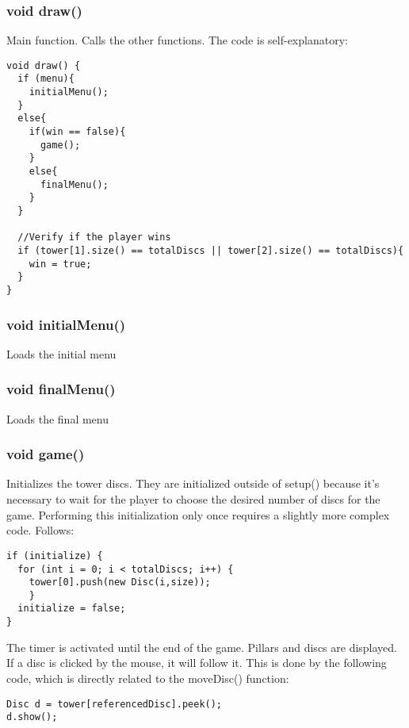 \documentclass[
	12pt,				%
	oneside,			%
	a4paper,			%
	english,			%
	brazil,				%
	]{abntex2}
\begin{document}
{\subsubsection{void draw()}
Main function. Calls the other functions. The code is self-explanatory:

\begin{itshape}
\begin{verbatim}
void draw() {
  if (menu){
    initialMenu(); 
  }
  else{
    if(win == false){  
      game();
    }
    else{
      finalMenu();
    }
  }

  //Verify if the player wins
  if (tower[1].size() == totalDiscs || tower[2].size() == totalDiscs){
    win = true;  
  }
}

\end{verbatim}
\end{itshape}
\subsubsection{void initialMenu()}
Loads the initial menu
\subsubsection{void finalMenu()}
Loads the final menu
\subsubsection{void game()}
Initializes the tower discs. They are initialized outside of setup() because it's necessary to wait for the player to choose the desired number of discs for the game. Performing this initialization only once requires a slightly more complex code. Follows:

\begin{itshape}
\begin{verbatim}
if (initialize) {
  for (int i = 0; i < totalDiscs; i++) {
    tower[0].push(new Disc(i,size));
    }
  initialize = false;
}
\end{verbatim}
\end{itshape}

The timer is activated until the end of the game. Pillars and discs are displayed. If a disc is clicked by the mouse, it will follow it. This is done by the following code, which is directly related to the moveDisc() function:

\begin{itshape}
\begin{verbatim}
Disc d = tower[referencedDisc].peek();
d.show();
      

\end{verbatim}
\end{itshape}}
\end{document}
